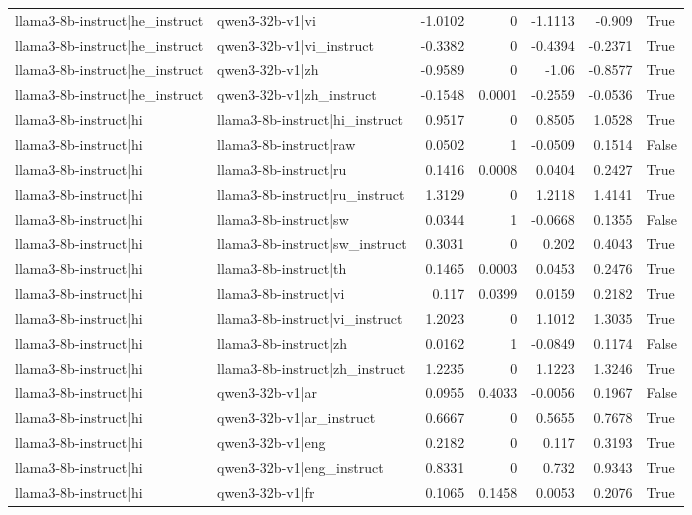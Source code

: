 \begin{table}
\begin{tabular}{l l r r r r l}
llama3-8b-instruct|he_instruct & qwen3-32b-v1|vi & -1.0102 & 0 & -1.1113 & -0.909 & True \\
llama3-8b-instruct|he_instruct & qwen3-32b-v1|vi_instruct & -0.3382 & 0 & -0.4394 & -0.2371 & True \\
llama3-8b-instruct|he_instruct & qwen3-32b-v1|zh & -0.9589 & 0 & -1.06 & -0.8577 & True \\
llama3-8b-instruct|he_instruct & qwen3-32b-v1|zh_instruct & -0.1548 & 0.0001 & -0.2559 & -0.0536 & True \\
llama3-8b-instruct|hi & llama3-8b-instruct|hi_instruct & 0.9517 & 0 & 0.8505 & 1.0528 & True \\
llama3-8b-instruct|hi & llama3-8b-instruct|raw & 0.0502 & 1 & -0.0509 & 0.1514 & False \\
llama3-8b-instruct|hi & llama3-8b-instruct|ru & 0.1416 & 0.0008 & 0.0404 & 0.2427 & True \\
llama3-8b-instruct|hi & llama3-8b-instruct|ru_instruct & 1.3129 & 0 & 1.2118 & 1.4141 & True \\
llama3-8b-instruct|hi & llama3-8b-instruct|sw & 0.0344 & 1 & -0.0668 & 0.1355 & False \\
llama3-8b-instruct|hi & llama3-8b-instruct|sw_instruct & 0.3031 & 0 & 0.202 & 0.4043 & True \\
llama3-8b-instruct|hi & llama3-8b-instruct|th & 0.1465 & 0.0003 & 0.0453 & 0.2476 & True \\
llama3-8b-instruct|hi & llama3-8b-instruct|vi & 0.117 & 0.0399 & 0.0159 & 0.2182 & True \\
llama3-8b-instruct|hi & llama3-8b-instruct|vi_instruct & 1.2023 & 0 & 1.1012 & 1.3035 & True \\
llama3-8b-instruct|hi & llama3-8b-instruct|zh & 0.0162 & 1 & -0.0849 & 0.1174 & False \\
llama3-8b-instruct|hi & llama3-8b-instruct|zh_instruct & 1.2235 & 0 & 1.1223 & 1.3246 & True \\
llama3-8b-instruct|hi & qwen3-32b-v1|ar & 0.0955 & 0.4033 & -0.0056 & 0.1967 & False \\
llama3-8b-instruct|hi & qwen3-32b-v1|ar_instruct & 0.6667 & 0 & 0.5655 & 0.7678 & True \\
llama3-8b-instruct|hi & qwen3-32b-v1|eng & 0.2182 & 0 & 0.117 & 0.3193 & True \\
llama3-8b-instruct|hi & qwen3-32b-v1|eng_instruct & 0.8331 & 0 & 0.732 & 0.9343 & True \\
llama3-8b-instruct|hi & qwen3-32b-v1|fr & 0.1065 & 0.1458 & 0.0053 & 0.2076 & True \\

\end{tabular}
\end{table}
